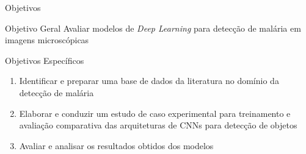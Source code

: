 \begin{frame}{Objetivos}
        \begin{block}{Objetivo Geral}
            Avaliar modelos de \emph{Deep Learning} para detecção de malária em imagens microscópicas
        \end{block}
        \begin{block}{Objetivos Específicos}
       \begin{enumerate}
    \item Identificar e preparar uma base de dados da literatura no domínio da detecção de malária
    \item Elaborar e conduzir um estudo de caso experimental para treinamento e avaliação comparativa das arquiteturas de CNNs para detecção de objetos
    \item Avaliar e analisar os resultados obtidos dos modelos
\end{enumerate}
\end{block}
\end{frame}
 

